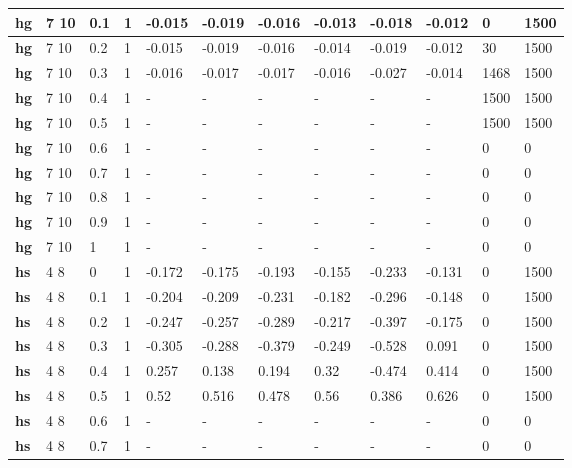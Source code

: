 \begin{table}[h]
\begin{tabular}[h]{|l|l|l|l|l|l|l|l|l|l|l|l|
    }
    \\ \hline
  \textbf{hg  } & 7 10       & 0.1 & 1 & -0.015 & -0.019 & -0.016 & -0.013 & -0.018 & -0.012 &    0 & 1500
    \\ \hline
  \textbf{hg  } & 7 10       & 0.2 & 1 & -0.015 & -0.019 & -0.016 & -0.014 & -0.019 & -0.012 &   30 & 1500
    \\ \hline
  \textbf{hg  } & 7 10       & 0.3 & 1 & -0.016 & -0.017 & -0.017 & -0.016 & -0.027 & -0.014 & 1468 & 1500
    \\ \hline
  \textbf{hg  } & 7 10       & 0.4 & 1 & - & - & - & - & - & - & 1500 & 1500
    \\ \hline
  \textbf{hg  } & 7 10       & 0.5 & 1 & - & - & - & - & - & - & 1500 & 1500
    \\ \hline
  \textbf{hg  } & 7 10       & 0.6 & 1 & - & - & - & - & - & - &    0 &    0
    \\ \hline
  \textbf{hg  } & 7 10       & 0.7 & 1 & - & - & - & - & - & - &    0 &    0
    \\ \hline
  \textbf{hg  } & 7 10       & 0.8 & 1 & - & - & - & - & - & - &    0 &    0
    \\ \hline
  \textbf{hg  } & 7 10       & 0.9 & 1 & - & - & - & - & - & - &    0 &    0
    \\ \hline
  \textbf{hg  } & 7 10       &   1 & 1 & - & - & - & - & - & - &    0 &    0
    \\ \hline
  \textbf{hs  } & 4 8        &   0 & 1 & -0.172 & -0.175 & -0.193 & -0.155 & -0.233 & -0.131 &    0 & 1500
    \\ \hline
  \textbf{hs  } & 4 8        & 0.1 & 1 & -0.204 & -0.209 & -0.231 & -0.182 & -0.296 & -0.148 &    0 & 1500
    \\ \hline
  \textbf{hs  } & 4 8        & 0.2 & 1 & -0.247 & -0.257 & -0.289 & -0.217 & -0.397 & -0.175 &    0 & 1500
    \\ \hline
  \textbf{hs  } & 4 8        & 0.3 & 1 & -0.305 & -0.288 & -0.379 & -0.249 & -0.528 &  0.091 &    0 & 1500
    \\ \hline
  \textbf{hs  } & 4 8        & 0.4 & 1 &  0.257 &  0.138 &  0.194 &   0.32 & -0.474 &  0.414 &    0 & 1500
    \\ \hline
  \textbf{hs  } & 4 8        & 0.5 & 1 &   0.52 &  0.516 &  0.478 &   0.56 &  0.386 &  0.626 &    0 & 1500
    \\ \hline
  \textbf{hs  } & 4 8        & 0.6 & 1 & - & - & - & - & - & - &    0 &    0
    \\ \hline
  \textbf{hs  } & 4 8        & 0.7 & 1 & - & - & - & - & - & - &    0 &    0

\end{tabular}
\end{table}
